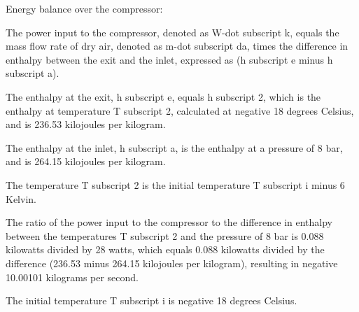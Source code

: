 Energy balance over the compressor:

The power input to the compressor, denoted as W-dot subscript k, equals the mass flow rate of dry air, denoted as m-dot subscript da, times the difference in enthalpy between the exit and the inlet, expressed as (h subscript e minus h subscript a).

The enthalpy at the exit, h subscript e, equals h subscript 2, which is the enthalpy at temperature T subscript 2, calculated at negative 18 degrees Celsius, and is 236.53 kilojoules per kilogram.

The enthalpy at the inlet, h subscript a, is the enthalpy at a pressure of 8 bar, and is 264.15 kilojoules per kilogram.

The temperature T subscript 2 is the initial temperature T subscript i minus 6 Kelvin.

The ratio of the power input to the compressor to the difference in enthalpy between the temperatures T subscript 2 and the pressure of 8 bar is 0.088 kilowatts divided by 28 watts, which equals 0.088 kilowatts divided by the difference (236.53 minus 264.15 kilojoules per kilogram), resulting in negative 10.00101 kilograms per second.

The initial temperature T subscript i is negative 18 degrees Celsius.